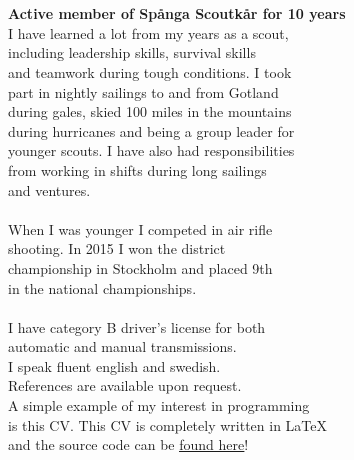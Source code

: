 \documentclass[11pt,oneside,a4paper,titlepage]{article}
\begin{document}
\begin{tcolorbox}
    \begin{minipage}[t]{2cm}
        \begin{tcolorbox}[colframe=white,colback=white]
            
        \end{tcolorbox}
    \end{minipage}
    \begin{minipage}[t]{15cm}
        \begin{tcolorbox}[colframe=white,colback=white]
            {\selectfont
                \\
                \\\textbf{Active member of Spånga Scoutkår for 10 years}\\
                I have learned a lot from my years as a scout,\\
                including leadership skills, survival skills\\
                and teamwork during tough conditions. I took\\
                part in nightly sailings to and from Gotland\\
                during gales, skied 100 miles in the mountains\\
                during hurricanes and being a group leader for\\
                younger scouts. I have also had responsibilities\\
                from working in shifts during long sailings\\
                and ventures.\\\\
                When I was younger I competed in air rifle\\
                shooting. In 2015 I won the district\\
                championship in Stockholm and placed 9th\\
                in the national championships.\\\\
                I have category B driver's license for both\\
                automatic and manual transmissions.\\

                I speak fluent english and swedish.\\

                References are available upon request.\\

                A simple example of my interest in programming\\
                is this CV. This CV is completely written in \LaTeX\\
                and the source code can be \underline{\href{https://github.com/v-olin/resume}{found here}}!
            }
        \end{tcolorbox}
    \end{minipage}
\end{tcolorbox}
\end{document}
